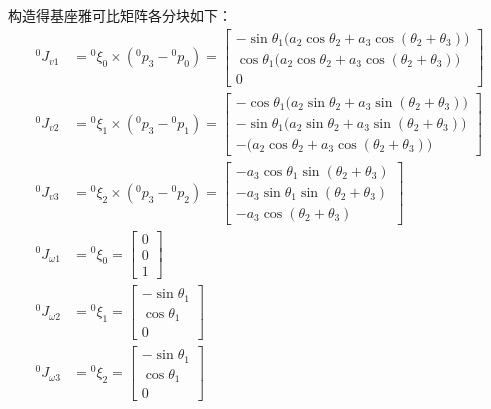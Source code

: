 \documentclass[UTF8, 13pt]{ctexart}
\begin{document}
构造得基座雅可比矩阵各分块如下：
\[
\begin{aligned}
    {}^0 J_{v1} &= {}^0\xi_0 \times ({}^0 p_3 - {}^0 p_0)
                = \begin{bmatrix}
                    -\sin\theta_1\big(a_2\cos\theta_2 + a_3\cos(\theta_2+\theta_3)\big) \\
                    \cos\theta_1\big(a_2\cos\theta_2 + a_3\cos(\theta_2+\theta_3)\big) \\
                    0
                \end{bmatrix} \\
    {}^0 J_{v2} &= {}^0\xi_1 \times ({}^0 p_3 - {}^0 p_1)
                = \begin{bmatrix}
                    -\cos\theta_1\big(a_2\sin\theta_2 + a_3\sin(\theta_2+\theta_3)\big) \\
                    -\sin\theta_1\big(a_2\sin\theta_2 + a_3\sin(\theta_2+\theta_3)\big) \\
                    -\big(a_2\cos\theta_2 + a_3\cos(\theta_2+\theta_3)\big)
                \end{bmatrix} \\
    {}^0 J_{v3} &= {}^0\xi_2 \times ({}^0 p_3 - {}^0 p_2)
                = \begin{bmatrix}
                    -a_3\cos\theta_1\sin(\theta_2+\theta_3) \\
                    -a_3\sin\theta_1\sin(\theta_2+\theta_3) \\
                    -a_3\cos(\theta_2+\theta_3)
                \end{bmatrix} \\
    {}^0 J_{\omega1} &= {}^0\xi_0
                = \begin{bmatrix}
                    0 \\ 0 \\ 1
                \end{bmatrix} \\
    {}^0 J_{\omega2} &= {}^0\xi_1
                = \begin{bmatrix}
                    -\sin\theta_1 \\ \cos\theta_1 \\ 0
                \end{bmatrix} \\
    {}^0 J_{\omega3} &= {}^0\xi_2
                = \begin{bmatrix}
                    -\sin\theta_1 \\ \cos\theta_1 \\ 0
                \end{bmatrix} \\
\end{aligned}
\]
\end{document}
